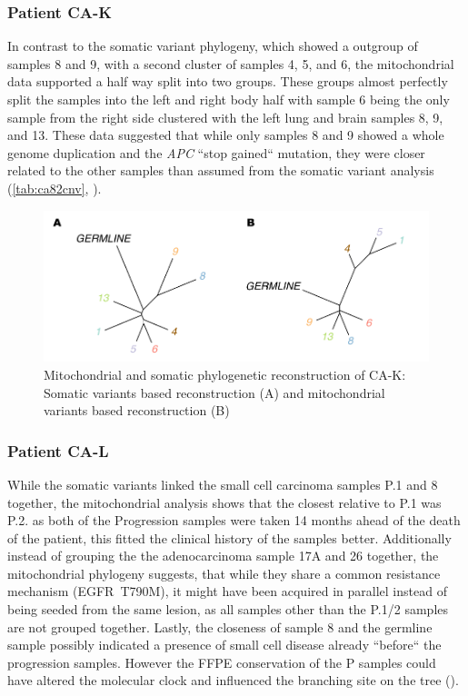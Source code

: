 \subsubsection{Patient CA-K}

In contrast to the somatic variant phylogeny, which showed a outgroup of samples 8 and 9, with a second cluster of samples 4, 5, and 6, the mitochondrial data supported a half way split into two groups. These groups almost perfectly split the samples into the left and right body half with sample 6 being the only sample from  the right side clustered with the left lung and brain samples 8, 9, and 13. These data suggested that while only samples 8 and 9 showed a whole genome duplication and the \textit{APC} ``stop gained`` mutation, they were closer related to the other samples than assumed from the somatic variant analysis (\autoref{tab:ca82cnv}, ).

\begin{figure}[ht]
\centering
\includegraphics[width=.99\linewidth]{Figures/CASCADE/mito/CA82SomVsMitoPhylo.pdf}
\caption[Mitochondrial and somatic phylogenetic reconstruction of CA-K]{Mitochondrial and somatic phylogenetic reconstruction of CA-K: Somatic variants based reconstruction (A) and mitochondrial variants based reconstruction (B)} \label{fig:CA82mitoPhylo}
\end{figure}


\subsubsection{Patient CA-L}
While the somatic variants linked the small cell carcinoma samples P.1 and 8 together, the mitochondrial analysis shows that the closest relative to P.1 was P.2. as both of the Progression samples were taken 14 months ahead of the death of the patient, this fitted the clinical history of the samples better. Additionally instead of grouping the the adenocarcinoma sample 17A and 26 together, the mitochondrial phylogeny suggests, that while they share a common resistance mechanism (EGFR~T790M), it might have been acquired in parallel instead of being seeded from the same lesion, as all samples other than the P.1/2 samples are not grouped together. Lastly, the closeness of sample 8 and the germline sample possibly indicated a presence of small cell disease already ``before`` the progression samples. However the FFPE conservation of the P samples could have altered the molecular clock and influenced the branching site on the tree ().

